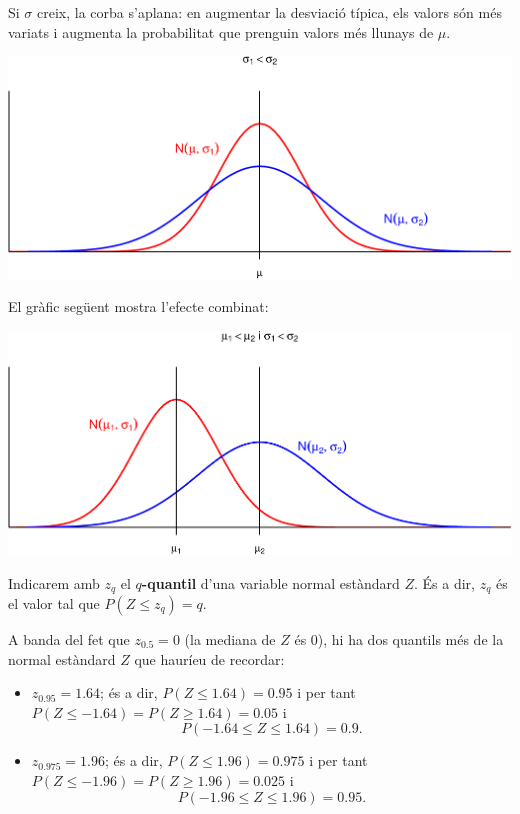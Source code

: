 \documentclass[
]{book}
\renewcommand{\leq}{\leqslant}
\renewcommand{\geq}{\geqslant}
\theoremstyle{definition}
\theoremstyle{definition}
\theoremstyle{definition}
\theoremstyle{remark}
\begin{document}
Si \(\sigma\) creix, la corba s'aplana: en augmentar la desviació típica, els valors són més variats i augmenta la probabilitat que prenguin valors més llunays de \(\mu\).

\begin{center}\includegraphics[width=0.8\linewidth]{Bioestadistica-II_files/figure-latex/unnamed-chunk-102-1} \end{center}

El gràfic següent mostra l'efecte combinat:

\begin{center}\includegraphics[width=0.8\linewidth]{Bioestadistica-II_files/figure-latex/unnamed-chunk-103-1} \end{center}

Indicarem amb \(z_q\) el \textbf{\(q\)-quantil} d'una variable normal estàndard \(Z\). És a dir, \(z_q\) és el valor tal que \(P(Z\leq z_q)=q\).

A banda del fet que \(z_{0.5}=0\) (la mediana de \(Z\) és 0), hi ha dos quantils més de la normal estàndard \(Z\) que hauríeu de recordar:

\begin{itemize}
\item
  \(z_{0.95}=1.64\); és a dir, \(P(Z\leq 1.64)=0.95\) i per tant \(P(Z\leq -1.64)=P(Z\geq 1.64)=0.05\) i
  \[
  P(-1.64\leq Z\leq 1.64)=0.9.
  \]
\item
  \(z_{0.975}=1.96\); és a dir, \(P(Z\leq 1.96)=0.975\) i per tant \(P(Z\leq -1.96)=P(Z\geq 1.96)=0.025\) i
  \[
  P(-1.96\leq Z\leq 1.96)=0.95.
  \]
\end{itemize}
\end{document}
